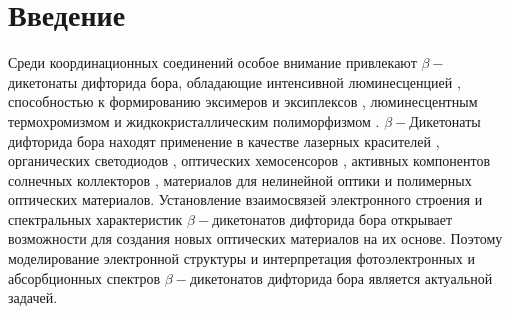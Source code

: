\chapter*{Введение}                         %

Среди координационных соединений особое внимание  привлекают $\beta-$дикетонаты дифторида бора, обладающие
интенсивной люминесценцией  \cite{butler2016mechanochromic,fedorenko2017new,zhang2018reversible,
guieu2015synthesis,wang2015red,mamiya2016photochemically}, способностью к формированию эксимеров 
\cite{mirochnik2003crystal,bukvetskii2010crystal} и эксиплексов \cite{chow1995exciplexes,chow1995exciplex},
люминесцентным термохромизмом \cite{mirocnik2005obratimyj} и жидкокристаллическим полиморфизмом 
\cite{turanova2010liquid,mayoral2011alkoxy,sanchez2012liquid,giziroglu20141}. $\beta-$Дикетонаты дифторида бора
находят применение в качестве лазерных красителей \cite{czerney1990german}, органических светодиодов 
\cite{derosa2015tailoring,daly2016blue} , оптических хемосенсоров \cite{zhai2016nanofibers,fraser2018oxygen,
samonina2015luminescent}, активных компонентов солнечных коллекторов \cite{halik2003german}, материалов для 
нелинейной оптики \cite{kammler1996second} и полимерных оптических материалов\cite{tanaka2013facile,
zhang2009role}.
Установление взаимосвязей электронного строения и спектральных характеристик $\beta-$дикетонатов дифторида бора 
открывает возможности для создания новых оптических материалов на их основе. Поэтому моделирование электронной 
структуры и интерпретация фотоэлектронных и абсорбционных спектров $\beta-$дикетонатов дифторида бора является 
актуальной задачей.

